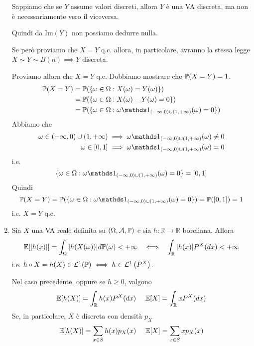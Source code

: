 \begin{enumerate}
\begin{oss}
Sappiamo che se $Y$ assume valori discreti, allora $Y$ è una VA discreta, ma non è necessariamente vero il viceversa.
\end{oss}

Quindi da $\mathrm{Im}(Y)$ non possiamo dedurre nulla.

Se però proviamo che $X=Y$ q.c. allora, in particolare, avranno la stessa legge $X\sim Y\sim B(n) \implies Y$ discreta.

Proviamo allora che $X=Y$ q.c. Dobbiamo mostrare che $\mathbb{P}(X=Y) =1$.
\begin{align*}
\PP(X=Y) & =\PP(\{\omega \in \Omega :X(\omega) =Y(\omega)\})\\
 & =\PP(\{\omega \in \Omega :X(\omega) -Y(\omega) =0\})\\
 & =\PP(\{\omega \in \Omega :\omega \Ind_{(-\infty ,0) \cup (1,+\infty)}(\omega) =0\})
\end{align*}
Abbiamo che
\begin{align*}
\omega \in (-\infty ,0) \cup (1,+\infty) & \implies \omega \Ind_{(-\infty ,0) \cup (1,+\infty)}(\omega) \neq 0\\
\omega \in [0,1] & \implies \omega \Ind_{(-\infty ,0) \cup (1,+\infty)}(\omega) =0
\end{align*}
i.e.
\begin{equation*}
\{\omega \in \Omega :\omega \Ind_{(-\infty ,0) \cup (1,+\infty)}(\omega) =0\} =[0,1]
\end{equation*}
Quindi
\begin{equation*}
\PP(X=Y) =\PP(\{\omega \in \Omega :\omega \Ind_{(-\infty ,0) \cup (1,+\infty)}(\omega) =0\}) =\PP([0,1]) =1
\end{equation*}
i.e. $X=Y$ q.c.
\item
\begin{theorem}
Sia $X$ una VA reale definita su $(\Omega ,\mathcal{A} ,\mathbb{P})$ e sia $h:\mathbb{R}\rightarrow \mathbb{R}$ boreliana. Allora
\begin{equation*}
\EE[|h(x)|] =\int_{\Omega }| h(X(\omega))| d\PP(\omega) < +\infty \ \ \iff \ \ \int_{\mathbb{R}}| h(x)| P^{X}(dx) < +\infty 
\end{equation*}
i.e. $h\circ X=h(X) \in \mathcal{L}^{1}(\mathbb{P}) \iff h\in \mathcal{L}^{1}\left(P^{X}\right)$.

Nel caso precedente, oppure se $h\geq 0$, valgono
\begin{equation*}
\mathbb{E}[h(X)] =\int_{\mathbb{R}} h(x) P^{X}(dx) \ \ \ \ \mathbb{E}[X] =\int_{\mathbb{R}} xP^{X}(dx)
\end{equation*}
Se, in particolare, $X$ è discreta con densità $p_{X}$
\begin{equation*}
\mathbb{E}[h(X)] =\sum\limits_{x\in S} h(x) p_{X}(x) \ \ \ \ \mathbb{E}[X] =\sum\limits_{x\in S} xp_{X}(x)
\end{equation*}
\end{theorem}


\end{enumerate}

